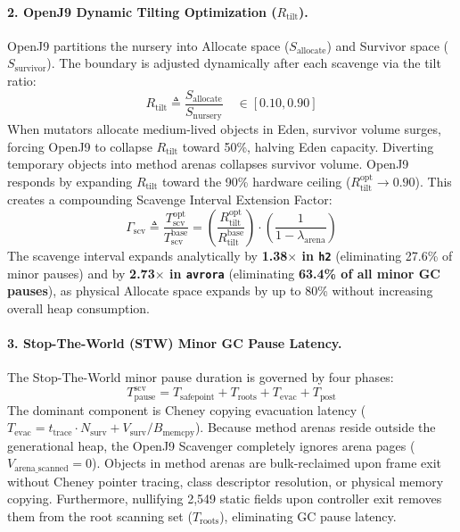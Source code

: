 \documentclass[12pt,a4paper]{article}
\begin{document}
\paragraph{2. OpenJ9 Dynamic Tilting Optimization ($R_{\text{tilt}}$).}
OpenJ9 partitions the nursery into Allocate space ($S_{\text{allocate}}$) and Survivor space ($S_{\text{survivor}}$). The boundary is adjusted dynamically after each scavenge via the tilt ratio:
\begin{equation}
R_{\text{tilt}} \triangleq \frac{S_{\text{allocate}}}{S_{\text{nursery}}} \quad \in [0.10, 0.90]
\end{equation}
When mutators allocate medium-lived objects in Eden, survivor volume surges, forcing OpenJ9 to collapse $R_{\text{tilt}}$ toward 50\%, halving Eden capacity. Diverting temporary objects into method arenas collapses survivor volume. OpenJ9 responds by expanding $R_{\text{tilt}}$ toward the 90\% hardware ceiling ($R_{\text{tilt}}^{\text{opt}} \to 0.90$). This creates a compounding Scavenge Interval Extension Factor:
\begin{equation}
\Gamma_{\text{scv}} \triangleq \frac{T_{\text{scv}}^{\text{opt}}}{T_{\text{scv}}^{\text{base}}} = \left(\frac{R_{\text{tilt}}^{\text{opt}}}{R_{\text{tilt}}^{\text{base}}}\right) \cdot \left(\frac{1}{1 - \lambda_{\text{arena}}}\right)
\end{equation}
The scavenge interval expands analytically by \textbf{1.38$\times$ in \texttt{h2}} (eliminating 27.6\% of minor pauses) and by \textbf{2.73$\times$ in \texttt{avrora}} (eliminating \textbf{63.4\% of all minor GC pauses}), as physical Allocate space expands by up to 80\% without increasing overall heap consumption.

\paragraph{3. Stop-The-World (STW) Minor GC Pause Latency.}
The Stop-The-World minor pause duration is governed by four phases:
\begin{equation}
T_{\text{pause}}^{\text{scv}} = T_{\text{safepoint}} + T_{\text{roots}} + T_{\text{evac}} + T_{\text{post}}
\end{equation}
The dominant component is Cheney copying evacuation latency ($T_{\text{evac}} = t_{\text{trace}} \cdot N_{\text{surv}} + V_{\text{surv}} / B_{\text{memcpy}}$). Because method arenas reside outside the generational heap, the OpenJ9 Scavenger completely ignores arena pages ($V_{\text{arena\_scanned}} = 0$). Objects in method arenas are bulk-reclaimed upon frame exit without Cheney pointer tracing, class descriptor resolution, or physical memory copying. Furthermore, nullifying 2{,}549 static fields upon controller exit removes them from the root scanning set ($T_{\text{roots}}$), eliminating GC pause latency.
\end{document}
